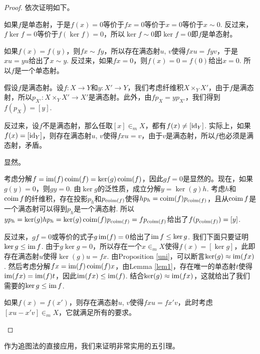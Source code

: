 \begin{proof}
依次证明如下。
\begin{compactenum}[~~~(1)]
\item 如果$f$是单态射，于是$f(x)=0$等价于$fx=0$等价于$x=0$等价于$x\sim 0$. 反过来，$f\ker f=0$等价于$f(\ker f)=0$，所以$\ker f\sim 0$即$\ker f=0$即$f$是单态射。

\item 如果$f(x)=f(y)$，则$fx\sim fy$，所以存在满态射$u$, $v$使得$fxu=fyv$，于是$xu=yu$给出了$x\sim y$. 反过来，如果$fx=0$，则$f(x)=0=f(0)$给出$x=0$. 所以$f$是一个单态射。

\item 假设$f$是满态射。设$f:X\to Y$和$y:X'\to Y$，我们考虑纤维积$X\times_Y X'$，由于$f$是满态射，所以$p_{X'}:X\times_Y X'\to X'$是满态射。此外，由$fp_X=yp_{X'}$，我们得到$f(p_X)=[y]$. 

反过来，设$f$不是满态射，那么任取$[x]\in_m X$，都有$f(x)\neq [\operatorname{id}_Y]$. 实际上，如果$f(x)=[\operatorname{id}_Y]$，则存在满态射$u$, $v$使得$fxu=v$，由于$v$是满态射，所以$f$也必须是满态射，矛盾。

\item 显然。

\item 考虑分解$f=\operatorname{im}(f)\operatorname{coim}(f)=\ker(g)\operatorname{coim}(f)$，因此$gf=0$是显然的。现在，如果$g(y)=0$，则$gy=0$. 由$\ker g$的泛性质，成立分解$y=\ker(g)h$. 考虑$h$和$\operatorname{coim} f$的纤维积，存在投影$p_h$和$p_{\operatorname{coim}(f)}$使得$hp_h=\operatorname{coim}(f)p_{\operatorname{coim}(f)}$，且从$\operatorname{coim} f$是一个满态射可以得到$p_h$是一个满态射. 所以$yp_h=\ker(g)hp_h=\ker(g)\operatorname{coim}(f)p_{\operatorname{coim}(f)}=fp_{\operatorname{coim}(f)}$给出了$f(p_{\operatorname{coim}(f)})=[y]$.

反过来，$gf=0$或等价的式子$g\operatorname{im}(f)=0$给出了$\operatorname{im} f \leq \ker g$. 我们下面只要证明$\ker g \leq \operatorname{im} f$. 由于$g\ker g=0$，所以存在一个$x\in_m X$使得$f(x)=[\ker g]$，此即存在满态射$u$使得$\ker(g)u=fx$. 由Proposition \ref{uni}，可以断言$\ker(g)\approx \operatorname{im}(fx)$. 然后考虑分解$fx=\operatorname{im}(f)\operatorname{coim}(f)x$，由Lemma \ref{lem1}，存在唯一的单态射$t$使得$\operatorname{im}(fx)=\operatorname{im}(f)t$，因此$\operatorname{im}(fx)\leq \operatorname{im}(f)$. 结合$\ker(g)\approx \operatorname{im}(fx)$，这就给出了我们需要的$\ker g\leq \operatorname{im} f$.

\item 如果$f(x)=f(x')$，则存在满态射$u$, $v$使得$fxu=fx'v$，此时考虑$[xu-x'v]\in_m X$，它就满足所有的要求。
\end{compactenum}
\end{proof}

作为追图法的直接应用，我们来证明非常实用的五引理。

